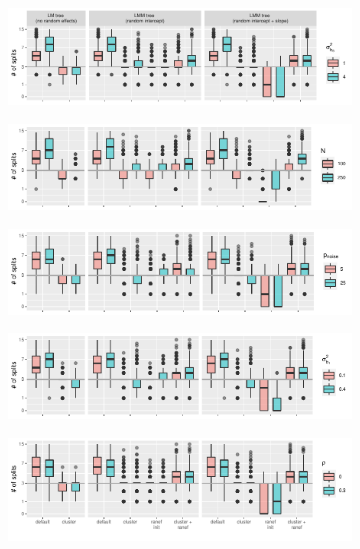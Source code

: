 \documentclass[doc,floatsintext,natbib]{apa7}
\begin{document}
\begin{figure}[!ht]
\caption{Effects of data-generating parameters on tree size for LM(M) trees.}
\begin{subfigure}{1.25\textwidth}
\includegraphics{_Partitioning_GCMs_with_GLMM_trees-032}
\end{subfigure}
\begin{subfigure}{1.25\textwidth}
\includegraphics{_Partitioning_GCMs_with_GLMM_trees-033}
\end{subfigure}
\begin{subfigure}{1.25\textwidth}
\includegraphics{_Partitioning_GCMs_with_GLMM_trees-034}
\end{subfigure}
\begin{subfigure}{1.25\textwidth}
\includegraphics{_Partitioning_GCMs_with_GLMM_trees-035}
\end{subfigure}
\begin{subfigure}{1.25\textwidth}
\includegraphics{_Partitioning_GCMs_with_GLMM_trees-036}

\end{subfigure}
\end{figure}
\end{document}
